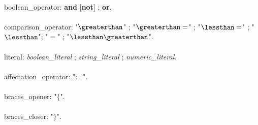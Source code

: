 {\begin{grammar}
\\
boolean\_operator: \textbf {and} $[$\textbf {not}$]$ ; \textbf {or}.\\
\\
comparison\_operator: "$\greaterthan$" ; "$\greaterthan=$" ;
"$\lessthan=$" ; "$\lessthan$"; "$=$" ; "$\lessthan\greaterthan$".\\
\\
literal: \textit{boolean\_literal} ; \textit{string\_literal} ;
\textit{numeric\_literal}.\\
\\
affectation\_operator: ":=".\\
\\
braces\_opener: "$\{$".\\
\\
braces\_closer: "$\}$".\\

\end{grammar}
}